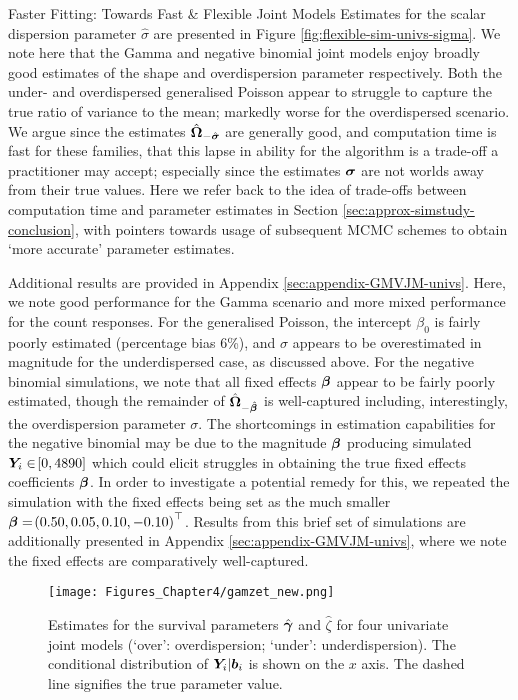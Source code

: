 \begin{chapter}{\label{cha:flexible}Faster Fitting: Towards Fast \& Flexible Joint Models}
Estimates for the scalar dispersion parameter $\hat{\sigma}$ are presented in Figure \ref{fig:flexible-sim-univs-sigma}. We note here that the Gamma and negative binomial joint models enjoy broadly good estimates of the shape and overdispersion parameter respectively. Both the under- and overdispersed generalised Poisson appear to struggle to capture the true ratio of variance to the mean; markedly worse for the overdispersed scenario. We argue since the estimates $\hat{\bm{\Omega}}_{-\hat{\bm{\sigma}}}$ are generally good, and computation time is fast for these families, that this lapse in ability for the algorithm is a trade-off a practitioner may accept; especially since the estimates $\bm{\sigma}$ are not worlds away from their true values. Here we refer back to the idea of trade-offs between computation time and parameter estimates in Section \ref{sec:approx-simstudy-conclusion}, with pointers towards usage of subsequent MCMC schemes to obtain `more accurate' parameter estimates.

Additional results are provided in Appendix \ref{sec:appendix-GMVJM-univs}. Here, we note good performance for the Gamma scenario and more mixed performance for the count responses. For the generalised Poisson, the intercept $\beta_0$ is fairly poorly estimated (percentage bias 6\%), and $\sigma$ appears to be overestimated in magnitude for the underdispersed case, as discussed above. For the negative binomial simulations, we note that all fixed effects $\bm{\beta}$ appear to be fairly poorly estimated, though the remainder of $\hat{\bm{\Omega}}_{-\hat{\bm{\beta}}}$ is well-captured including, interestingly, the overdispersion parameter $\sigma$. The shortcomings in estimation capabilities for the negative binomial may be due to the magnitude $\bm{\beta}$ producing simulated $\bm{Y}_i\in\!\left[0,4890\right]$ which could elicit struggles in obtaining the true fixed effects coefficients $\bm{\beta}$. In order to investigate a potential remedy for this, we repeated the simulation with the fixed effects being set as the much smaller $\bm{\beta}=\!\left(0.50,0.05,0.10,-0.10\right)^\top$. Results from this brief set of simulations are additionally presented in Appendix \ref{sec:appendix-GMVJM-univs}, where we note the fixed effects are comparatively well-captured.

\begin{figure}
    \centering
    \texttt{[image: Figures\_Chapter4/gamzet\_new.png]}
    \caption{Estimates for the survival parameters $\hat{\bm{\gamma}}$ and $\hat{\zeta}$ for four univariate joint models (`over': overdispersion; `under': underdispersion). The conditional distribution of $\bm{Y}_i|\bm{b}_i$ is shown on the $x$ axis. The dashed line signifies the true parameter value.}
    \label{fig:flexible-sim-univs-gamzet}
\end{figure}


\end{chapter}
